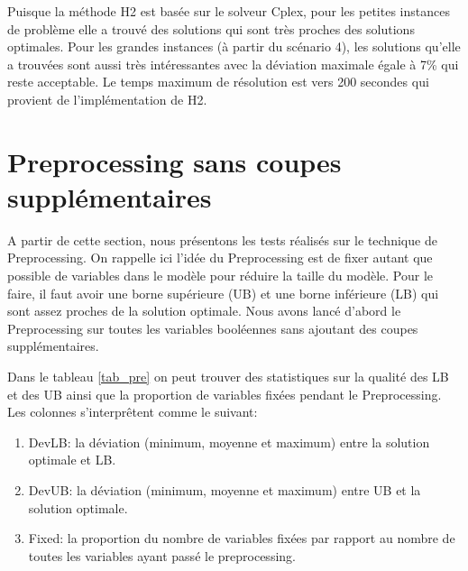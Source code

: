 Puisque la méthode H2 est basée sur le solveur Cplex, pour les petites instances de problème elle a trouvé des solutions qui sont très proches des solutions optimales. Pour les grandes instances (à partir du scénario 4), les solutions qu'elle a trouvées sont aussi très intéressantes avec la déviation maximale égale à 7\% qui reste acceptable. Le temps maximum de résolution est vers 200 secondes qui provient de l'implémentation de H2.






\section{Preprocessing sans coupes supplémentaires}\label{test_prep_nocut}
A partir de cette section, nous présentons les tests réalisés sur le technique de Preprocessing. On rappelle ici l'idée du Preprocessing est de fixer autant que possible de variables dans le modèle pour réduire la taille du modèle. Pour le faire, il faut avoir une borne supérieure (UB) et une borne inférieure (LB) qui sont assez proches de la solution optimale.
Nous avons lancé d'abord le Preprocessing sur toutes les variables booléennes sans ajoutant des coupes supplémentaires.

Dans le tableau \ref{tab_pre} on peut trouver des statistiques sur la qualité des LB et des UB ainsi que la proportion de variables fixées pendant le Preprocessing. Les colonnes s'interprêtent comme le suivant:
\begin{enumerate}
	\item DevLB: la déviation (minimum, moyenne et maximum) entre la solution optimale et LB.
	\item DevUB: la déviation (minimum, moyenne et maximum) entre UB et la solution optimale.
	\item Fixed: la proportion du nombre de variables fixées par rapport au nombre de toutes les variables ayant passé le preprocessing.
\end{enumerate}

